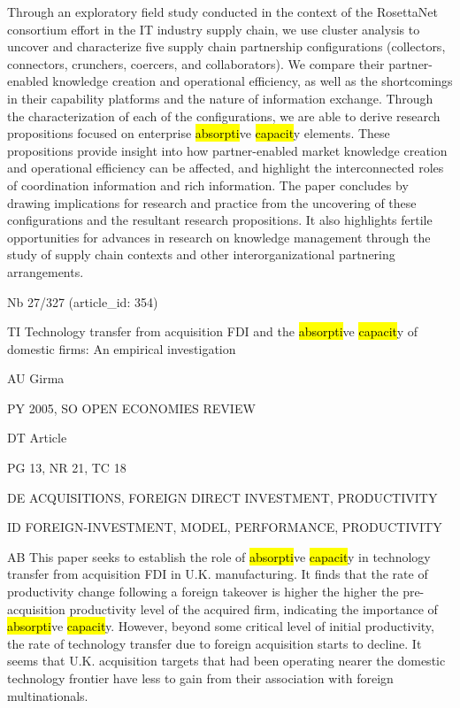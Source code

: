 \documentclass[a4paper]{article}
\begin{document}
Through an exploratory field study conducted in the context of the RosettaNet consortium effort in the IT industry supply chain, we use cluster analysis to uncover and characterize five supply chain partnership configurations (collectors, connectors, crunchers, coercers, and collaborators). We compare their partner-enabled knowledge creation and operational efficiency, as well as the shortcomings in their capability platforms and the nature of information exchange. Through the characterization of each of the configurations, we are able to derive research propositions focused on enterprise \hl{absorpti}ve \hl{capacit}y elements. These propositions provide insight into how partner-enabled market knowledge creation and operational efficiency can be affected, and highlight the interconnected roles of coordination information and rich information. The paper concludes by drawing implications for research and practice from the uncovering of these configurations and the resultant research propositions. It also highlights fertile opportunities for advances in research on knowledge management through the study of supply chain contexts and other interorganizational partnering arrangements.\par
\clearpage

\vspace*{-2cm}
Nb \tabto{0cm}27/327 (article\_id: 354)\par
TI \tabto{0cm}Technology transfer from acquisition FDI and the \hl{absorpti}ve \hl{capacit}y of domestic firms: An empirical investigation\par
AU \tabto{0cm}Girma\par
PY \tabto{0cm}2005, SO OPEN ECONOMIES REVIEW\par
DT \tabto{0cm}Article\par
PG \tabto{0cm}13, NR 21, TC 18\par
DE \tabto{0cm}ACQUISITIONS, FOREIGN DIRECT INVESTMENT, PRODUCTIVITY\par
ID \tabto{0cm}FOREIGN-INVESTMENT, MODEL, PERFORMANCE, PRODUCTIVITY\par
AB \tabto{0cm}This paper seeks to establish the role of \hl{absorpti}ve \hl{capacit}y in technology transfer from acquisition FDI in U.K. manufacturing. It finds that the rate of productivity change following a foreign takeover is higher the higher the pre-acquisition productivity level of the acquired firm, indicating the importance of \hl{absorpti}ve \hl{capacit}y. However, beyond some critical level of initial productivity, the rate of technology transfer due to foreign acquisition starts to decline. It seems that U.K. acquisition targets that had been operating nearer the domestic technology frontier have less to gain from their association with foreign multinationals.\par
\clearpage
\end{document}
